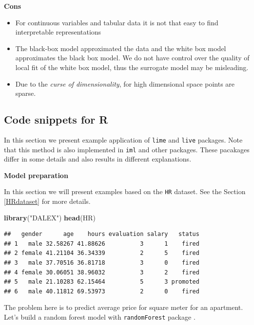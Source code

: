 \documentclass[]{krantz}
\newenvironment{Shaded}{\begin{snugshade}}{\end{snugshade}}
\newcommand{\KeywordTok}[1]{\textcolor[rgb]{0.13,0.29,0.53}{\textbf{#1}}}
\newcommand{\NormalTok}[1]{#1}
\newcommand{\StringTok}[1]{\textcolor[rgb]{0.31,0.60,0.02}{#1}}
\providecommand{\tightlist}{%
  \setlength{\itemsep}{0pt}\setlength{\parskip}{0pt}}
\theoremstyle{definition}
\theoremstyle{definition}
\theoremstyle{definition}
\theoremstyle{remark}
\begin{document}
\textbf{Cons}

\begin{itemize}
\tightlist
\item
  For continuous variables and tabular data it is not that easy to find
  interpretable representations
\item
  The black-box model approximated the data and the white box model
  approximates the black box model. We do not have control over the
  quality of local fit of the white box model, thus the surrogate model
  may be misleading.
\item
  Due to the \emph{curse of dimensionality}, for high dimensional space
  points are sparse.
\end{itemize}

\hypertarget{code-snippets-for-r-3}{%
\subsection{Code snippets for R}\label{code-snippets-for-r-3}}

In this section we present example application of \texttt{lime}
\citep{R-lime} and \texttt{live} \citep{R-live} packages. Note that this
method is also implemented in \texttt{iml} \citep{R-iml} and other
packages. These pacakages differ in some details and also results in
different explanations.

\textbf{Model preparation}

In this section we will present examples based on the \texttt{HR}
dataset. See the Section \ref{HRdataset} for more details.

\begin{Shaded}
\begin{Highlighting}[]
\KeywordTok{library}\NormalTok{(}\StringTok{"DALEX"}\NormalTok{)}
\KeywordTok{head}\NormalTok{(HR)}
\end{Highlighting}
\end{Shaded}

\begin{verbatim}
##   gender      age    hours evaluation salary   status
## 1   male 32.58267 41.88626          3      1    fired
## 2 female 41.21104 36.34339          2      5    fired
## 3   male 37.70516 36.81718          3      0    fired
## 4 female 30.06051 38.96032          3      2    fired
## 5   male 21.10283 62.15464          5      3 promoted
## 6   male 40.11812 69.53973          2      0    fired
\end{verbatim}

The problem here is to predict average price for square meter for an
apartment. Let's build a random forest model with \texttt{randomForest}
package \citep{R-randomForest}.
\end{document}
